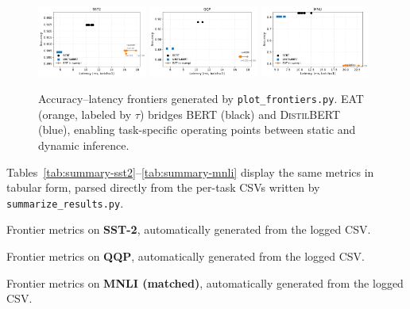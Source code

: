 \documentclass[11pt,letterpaper]{article}
\theoremstyle{plain}
\newcommand{\eat}{\textsc{EAT}}
\newcommand{\bert}{\textsc{BERT}}
\newcommand{\distilbert}{\textsc{DistilBERT}}
\begin{document}
\begin{figure}[t]
  \centering
  \includegraphics[width=0.32\textwidth]{results/plots/frontier_sst2.pdf}
  \includegraphics[width=0.32\textwidth]{results/plots/frontier_qqp.pdf}
  \includegraphics[width=0.32\textwidth]{results/plots/frontier_mnli.pdf}
  \caption{Accuracy--latency frontiers generated by \texttt{plot\_frontiers.py}.
  \eat{} (orange, labeled by $\tau$) bridges \bert{} (black) and \distilbert{} (blue), enabling task-specific operating points between static and dynamic inference.}
  \label{fig:frontiers}
\end{figure}

\noindent
Tables~\ref{tab:summary-sst2}--\ref{tab:summary-mnli} display the same metrics in tabular form,
parsed directly from the per-task CSVs written by \texttt{summarize\_results.py}.

\begin{table}[t]
  \centering
  \caption{Frontier metrics on \textbf{SST-2}, automatically generated from the logged CSV.}
  \label{tab:summary-sst2}
\end{table}

\begin{table}[t]
  \centering
  \caption{Frontier metrics on \textbf{QQP}, automatically generated from the logged CSV.}
  \label{tab:summary-qqp}
\end{table}

\begin{table}[t]
  \centering
  \caption{Frontier metrics on \textbf{MNLI (matched)}, automatically generated from the logged CSV.}
  \label{tab:summary-mnli}
\end{table}
\end{document}
